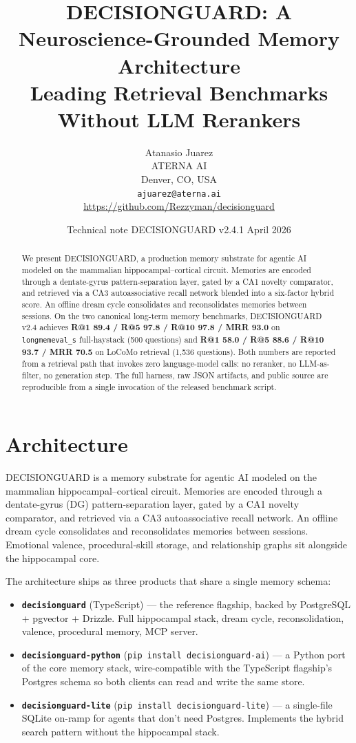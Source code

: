 \documentclass{article}
\title{%
  DECISIONGUARD: A Neuroscience-Grounded Memory Architecture \\
  Leading Retrieval Benchmarks Without LLM Rerankers
}
\author{%
  Atanasio Juarez \\
  ATERNA AI \\
  Denver, CO, USA \\
  \texttt{ajuarez@aterna.ai} \\
  \url{https://github.com/Rezzyman/decisionguard}
}
\date{Technical note \textperiodcentered{} DECISIONGUARD v2.4.1 \textperiodcentered{} April 2026}
\begin{document}
\maketitle

\begin{abstract}
We present DECISIONGUARD, a production memory substrate for agentic AI
modeled on the mammalian hippocampal--cortical circuit. Memories are
encoded through a dentate-gyrus pattern-separation layer, gated by a
CA1 novelty comparator, and retrieved via a CA3 autoassociative recall
network blended into a six-factor hybrid score. An offline dream cycle
consolidates and reconsolidates memories between sessions. On the two
canonical long-term memory benchmarks, DECISIONGUARD v2.4 achieves
\textbf{R@1 89.4 / R@5 97.8 / R@10 97.8 / MRR 93.0} on
\texttt{longmemeval\_s} full-haystack (500 questions) and
\textbf{R@1 58.0 / R@5 88.6 / R@10 93.7 / MRR 70.5} on LoCoMo retrieval
(1{,}536 questions). Both numbers are reported from a retrieval path
that invokes zero language-model calls: no reranker, no LLM-as-filter,
no generation step. The full harness, raw JSON artifacts, and public
source are reproducible from a single invocation of the released
benchmark script.
\end{abstract}

\section{Architecture}

DECISIONGUARD is a memory substrate for agentic AI modeled on the mammalian
hippocampal--cortical circuit. Memories are encoded through a
dentate-gyrus (DG) pattern-separation layer, gated by a CA1 novelty
comparator, and retrieved via a CA3 autoassociative recall network. An
offline dream cycle consolidates and reconsolidates memories between
sessions. Emotional valence, procedural-skill storage, and relationship
graphs sit alongside the hippocampal core.

The architecture ships as three products that share a single memory
schema:

\begin{itemize}
  \item \textbf{\texttt{decisionguard}} (TypeScript) --- the reference flagship,
        backed by PostgreSQL + pgvector + Drizzle. Full hippocampal
        stack, dream cycle, reconsolidation, valence, procedural memory,
        MCP server.
  \item \textbf{\texttt{decisionguard-python}} (\texttt{pip install decisionguard-ai})
        --- a Python port of the core memory stack, wire-compatible
        with the TypeScript flagship's Postgres schema so both clients
        can read and write the same store.
  \item \textbf{\texttt{decisionguard-lite}} (\texttt{pip install decisionguard-lite})
        --- a single-file SQLite on-ramp for agents that don't need
        Postgres. Implements the hybrid search pattern without the
        hippocampal stack.
\end{itemize}
\end{document}
